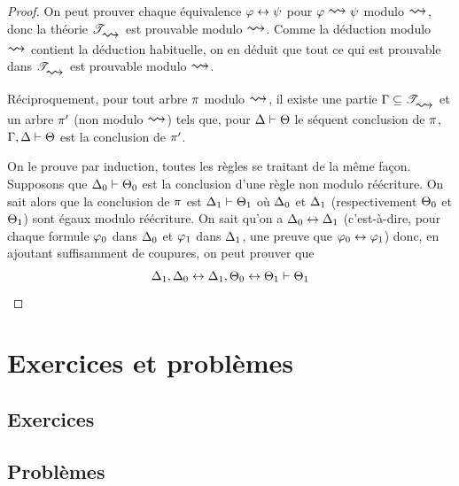 \begin{proof}
  On peut prouver chaque équivalence $\varphi\mathrel{\leftrightarrow}\psi$ pour
  $\varFF\reecr{}\varFP$ modulo $\reecr{}$, donc la théorie
  $\varT_{\reecr{}}$ est prouvable modulo $\reecr{}$. Comme
  la déduction modulo $\reecr{}$ contient la déduction
  habituelle, on en déduit que tout ce qui est prouvable
  dans $\varT_{\reecr{}}$ est prouvable modulo $\reecr{}$.

  Réciproquement, pour tout arbre $\pi$ modulo $\reecr{}$, il
  existe une partie $\varCG\subseteq\varT_{\reecr{}}$ et un
  arbre $\pi'$ (non modulo $\reecr{}$) tels
  que, pour $\Delta\vdash\Theta$ le séquent conclusion de
  $\pi$, $\Gamma,\Delta\vdash\Theta$ est la conclusion de
  $\pi'$.

  On le prouve par induction, toutes les règles se traitant
  de la même façon. Supposons que $\Delta_0\vdash\Theta_0$ est
  la conclusion d'une règle non modulo réécriture. On sait
  alors que la conclusion de $\pi$ est $\Delta_1\vdash\Theta_1$
  où $\Delta_0$ et $\Delta_1$ (respectivement $\Theta_0$ et
  $\Theta_1$) sont égaux modulo réécriture. On sait qu'on
  a $\Delta_0 \mathrel{\leftrightarrow} \Delta_1$ (c'est-à-dire, pour chaque
  formule $\varphi_0$ dans $\Delta_0$ et $\varphi_1$ dans
  $\Delta_1$, une preuve que $\varphi_0\mathrel{\leftrightarrow}\varphi_1$)
  donc, en ajoutant suffisamment de coupures, on peut prouver
  que
  \[\Delta_1,\Delta_0\mathrel{\leftrightarrow}\Delta_1,\Theta_0\mathrel{\leftrightarrow}\Theta_1\vdash
  \Theta_1\qedhere\]
\end{proof}

\clearpage

\section{Exercices et problèmes}

\subsection{Exercices}

\clearpage

\subsection{Problèmes}

